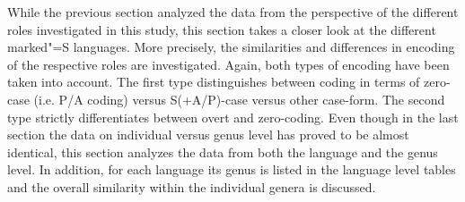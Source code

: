 While the previous section analyzed the data from the perspective of the different roles investigated in this study, this section takes a closer look at the different marked"=S languages. 
More precisely, the similarities and differences in encoding of the respective roles are investigated. 
Again, both types of encoding have been taken into account. 
The first type distinguishes between coding in terms of zero-case (i.e. P/A coding) versus S(+A/P)-case versus other case-form. 
The second type strictly differentiates between overt and zero-coding.
Even though in the last section the data on individual versus genus level has proved to be almost identical, this section analyzes the data from both the language and the genus level. In addition, for each language its genus is listed in the language level tables and the overall similarity within the individual genera is discussed.

